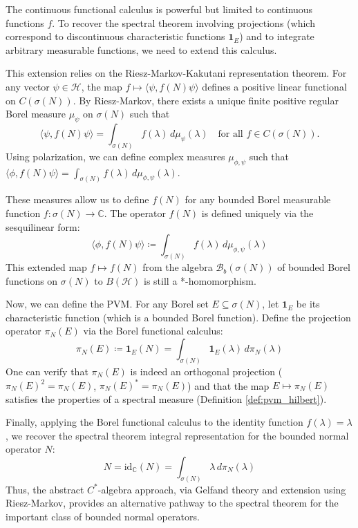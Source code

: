 The continuous functional calculus is powerful but limited to continuous functions $f$. To recover the spectral theorem involving projections (which correspond to discontinuous characteristic functions $\mathbf{1}_E$) and to integrate arbitrary measurable functions, we need to extend this calculus.

This extension relies on the Riesz-Markov-Kakutani representation theorem. For any vector $\psi \in \mathcal{H}$, the map $f \mapsto \langle \psi, f(N) \psi \rangle$ defines a positive linear functional on $C(\sigma(N))$. By Riesz-Markov, there exists a unique finite positive regular Borel measure $\mu_\psi$ on $\sigma(N)$ such that
\[ \langle \psi, f(N) \psi \rangle = \int_{\sigma(N)} f(\lambda) \, d\mu_\psi(\lambda) \quad \text{for all } f \in C(\sigma(N)). \]
Using polarization, we can define complex measures $\mu_{\phi,\psi}$ such that $\langle \phi, f(N) \psi \rangle = \int_{\sigma(N)} f(\lambda) \, d\mu_{\phi,\psi}(\lambda)$.

These measures allow us to define $f(N)$ for any bounded Borel measurable function $f: \sigma(N) \to \mathbb{C}$. The operator $f(N)$ is defined uniquely via the sesquilinear form:
\[ \langle \phi, f(N) \psi \rangle \coloneqq \int_{\sigma(N)} f(\lambda) \, d\mu_{\phi,\psi}(\lambda) \]
This extended map $f \mapsto f(N)$ from the algebra $\mathcal{B}_b(\sigma(N))$ of bounded Borel functions on $\sigma(N)$ to $B(\mathcal{H})$ is still a *-homomorphism.

Now, we can define the PVM. For any Borel set $E \subseteq \sigma(N)$, let $\mathbf{1}_E$ be its characteristic function (which is a bounded Borel function). Define the projection operator $\pi_N(E)$ via the Borel functional calculus:
\[ \pi_N(E) \coloneqq \mathbf{1}_E(N) = \int_{\sigma(N)} \mathbf{1}_E(\lambda) \, d\pi_N(\lambda) \]
One can verify that $\pi_N(E)$ is indeed an orthogonal projection ($\pi_N(E)^2 = \pi_N(E)$, $\pi_N(E)^* = \pi_N(E)$) and that the map $E \mapsto \pi_N(E)$ satisfies the properties of a spectral measure (Definition \ref{def:pvm_hilbert}).

Finally, applying the Borel functional calculus to the identity function $f(\lambda)=\lambda$, we recover the spectral theorem integral representation for the bounded normal operator $N$:
\[ N = \mathrm{id}_{\mathbb{C}}(N) = \int_{\sigma(N)} \lambda \, d\pi_N(\lambda) \]
Thus, the abstract $C^*$-algebra approach, via Gelfand theory and extension using Riesz-Markov, provides an alternative pathway to the spectral theorem for the important class of bounded normal operators.

